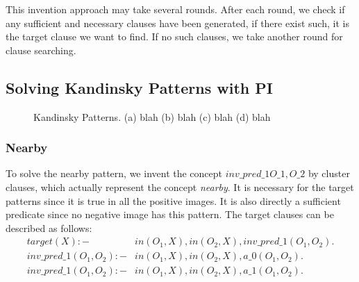 \documentclass[
]{ceurart}
\begin{document}
This invention approach may take several rounds. After each round, we check if any sufficient and necessary clauses have been generated, if there exist such, it is the target clause we want to find. If no such clauses, we take another round for clause searching.

\subsection{Solving Kandinsky Patterns with PI}

\begin{figure}[!htb]
	\centering
	\caption{Kandinsky Patterns. (a) blah (b) blah (c) blah (d) blah}
	\label{fig:kandinsky-patterns}
\end{figure}

\subsubsection{Nearby}
To solve the nearby pattern, we invent the concept $ inv\_pred\_1O\_1, O\_2 $ by cluster clauses, which actually represent the concept \textit{nearby}. It is necessary for the target patterns since it is true in all the positive images. It is also directly a sufficient predicate since no negative image has this pattern. The target clauses can be described as follows:
\begin{align*}
	target(X) :- & in(O_1,X),in(O_2,X), inv\_pred\_1(O_1,O_2).\\
	inv\_pred\_1(O_1, O_2) :- 	& in(O_1,X), in(O_2,X), a\_0(O_1,O_2).\\
	inv\_pred\_1(O_1, O_2) :- 	& in(O_1,X), in(O_2,X), a\_1(O_1,O_2).\\									
\end{align*}
\end{document}
